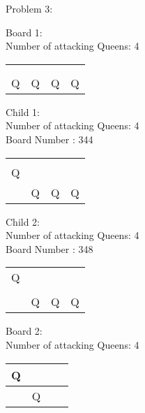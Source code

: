 \documentclass[a4paper,10pt]{article}
\begin{document}
\begin{flushleft}
\begin{flushleft}
\begin{flushleft}
\begin{flushleft}
\begin{flushleft}
\vspace{5mm}
\break
Problem 3:\\
\vspace{2mm}
\hline
\begin{flushleft}
Board 1:\\
Number of attacking Queens: 4\\
\vspace{5mm}
    \begin{tabular}{| l | l | l | l |}
    \hline
     & & & \\ \hline
     & & & \\ \hline
     & & & \\ \hline
     Q & Q & Q & Q \\ \hline
    \end{tabular}
\begin{flushleft}
Child 1:\\
Number of attacking Queens: 4\\
Board Number : 344\\
\vspace{5mm}
    \begin{tabular}{| l | l | l | l |}
    \hline
     & & & \\ \hline
     & & & \\ \hline
     Q & & & \\ \hline
     & Q & Q & Q \\ \hline
    \end{tabular}
\begin{flushleft}
Child 2:\\
Number of attacking Queens: 4\\
Board Number : 348\\
\vspace{5mm}
    \begin{tabular}{| l | l | l | l |}
    \hline
     & & & \\ \hline
     Q & & & \\ \hline
     & & & \\ \hline
     & Q & Q & Q \\ \hline
    \end{tabular}
\begin{flushleft}
Board 2:\\
Number of attacking Queens: 4 \\
\vspace{5mm}
    \begin{tabular}{| l | l | l | l |}
    \hline
     Q & & & \\ \hline
     & Q & & \\ \hline

\end{tabular}
\end{flushleft}
\end{flushleft}
\end{flushleft}
\end{flushleft}
\end{flushleft}
\end{flushleft}
\end{flushleft}
\end{flushleft}
\end{flushleft}
\end{document}
